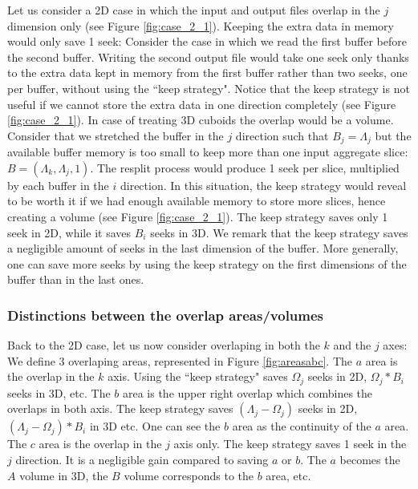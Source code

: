 \documentclass[conference]{IEEEtran}
\begin{document}
Let us consider a 2D case in which the input and output files overlap in the $j$ dimension only (see Figure \ref{fig:case_2_1}).
Keeping the extra data in memory would only save 1 seek:
Consider the case in which we read the first buffer before the second buffer.
Writing the second output file would take one seek only thanks to the extra data kept in memory from the first buffer rather than two seeks, one per buffer, without using the ``keep strategy".
Notice that the keep strategy is not useful if we cannot store the extra data in one direction completely (see Figure \ref{fig:case_2_1}).
In case of treating 3D cuboids the overlap would be a volume.
Consider that we stretched the buffer in the $j$ direction such that $B_j = \Lambda_j$ but the available buffer memory is too small to keep more than one input aggregate slice: $B=(\Lambda_k, \Lambda_j, 1)$.
The resplit process would produce 1 seek per slice, multiplied by each buffer in the $i$ direction.
In this situation, the keep strategy would reveal to be worth it if we had enough available memory to store more slices, hence creating a volume (see Figure \ref{fig:case_2_1}).
The keep strategy saves only 1 seek in 2D, while it saves $B_i$ seeks in 3D.
We remark that the keep strategy saves a negligible amount of seeks in the last dimension of the buffer.
More generally, one can save more seeks by using the keep strategy on the first dimensions of the buffer than in the last ones.

\subsubsection{Distinctions between the overlap areas/volumes}
Back to the 2D case, let us now consider overlaping in both the $k$ and the $j$ axes:
We define 3 overlaping areas, represented in Figure \ref{fig:areasabc}.
The $a$ area is the overlap in the $k$ axis.
Using the ``keep strategy" saves $\Omega_j$ seeks in 2D, $\Omega_j*B_i$ seeks in 3D, etc.
The $b$ area is the upper right overlap which combines the overlaps in both axis. The keep strategy saves $(\Lambda_j-\Omega_j)$ seeks in 2D, $(\Lambda_j-\Omega_j)*B_i$ in 3D etc.
One can see the $b$ area as the continuity of the $a$ area.
The $c$ area is the overlap in the $j$ axis only.
The keep strategy saves 1 seek in the $j$ direction.
It is a negligible gain compared to saving $a$ or $b$.
The $a$ becomes the $A$ volume in 3D, the $B$ volume corresponds to the $b$ area, etc.
\end{document}
